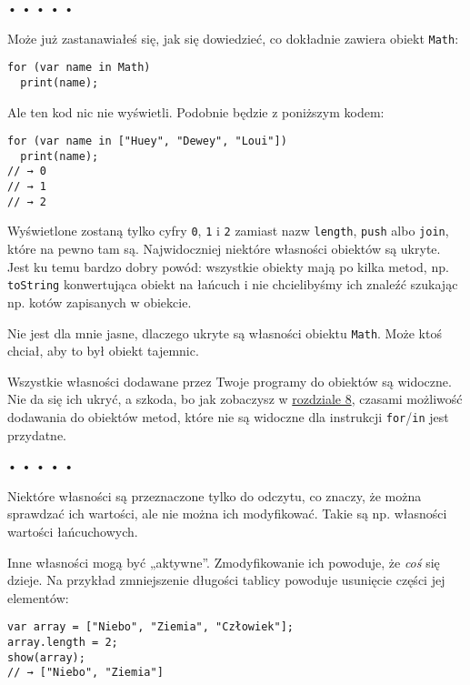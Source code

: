   
  
\begin{center}
• • • • •
\end{center}
  
    
Może już zastanawiałeś się, jak się dowiedzieć, co dokładnie zawiera obiekt \texttt{Math}:

    
\begin{verbatim} 
for (var name in Math)
  print(name);
\end{verbatim}
    
Ale ten kod nic nie wyświetli. Podobnie będzie z poniższym kodem:

    
\begin{verbatim} 
for (var name in ["Huey", "Dewey", "Loui"])
  print(name);
// → 0
// → 1
// → 2
\end{verbatim}
    
Wyświetlone zostaną tylko cyfry \texttt{0}, \texttt{1} i \texttt{2} zamiast nazw \texttt{length}, \texttt{push} albo \texttt{join}, które na pewno tam są. Najwidoczniej niektóre własności obiektów są ukryte. Jest ku temu bardzo dobry powód: wszystkie obiekty mają po kilka metod, np. \texttt{toString} konwertująca obiekt na łańcuch i nie chcielibyśmy ich znaleźć szukając np. kotów zapisanych w obiekcie.

    
Nie jest dla mnie jasne, dlaczego ukryte są własności obiektu \texttt{Math}. Może ktoś chciał, aby to był obiekt tajemnic.

    
Wszystkie własności dodawane przez Twoje programy do obiektów są widoczne. Nie da się ich ukryć, a szkoda, bo jak zobaczysz w \hyperref[chap:8]{rozdziale 8}, czasami możliwość dodawania do obiektów metod, które nie są widoczne dla instrukcji \texttt{for}/\texttt{in} jest przydatne.
  
  
\begin{center}
• • • • •
\end{center}
  
    
Niektóre własności są przeznaczone tylko do odczytu, co znaczy, że można sprawdzać ich wartości, ale nie można ich modyfikować. Takie są np. własności wartości łańcuchowych.

    
Inne własności mogą być „aktywne”. Zmodyfikowanie ich powoduje, że \emph{coś} się dzieje. Na przykład zmniejszenie długości tablicy powoduje usunięcie części jej elementów:

    
\begin{verbatim} 
var array = ["Niebo", "Ziemia", "Człowiek"];
array.length = 2;
show(array);
// → ["Niebo", "Ziemia"]
\end{verbatim}